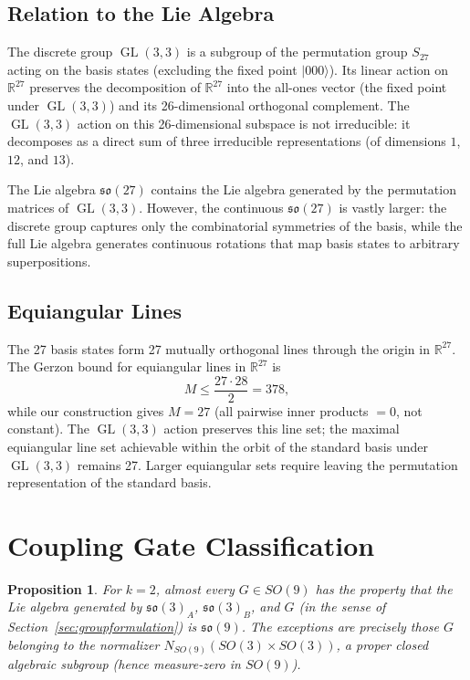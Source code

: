 \documentclass[12pt,a4paper]{article}
\newtheorem{proposition}[theorem]{Proposition}
\newcommand{\GL}{\operatorname{GL}}
\begin{document}
\subsection{Relation to the Lie Algebra}

The discrete group $\GL(3,3)$ is a subgroup of the permutation group
$S_{27}$ acting on the basis states (excluding the fixed point
$|000\rangle$). Its linear action on $\mathbb{R}^{27}$ preserves the
decomposition of $\mathbb{R}^{27}$ into the all-ones vector (the fixed
point under $\GL(3,3)$) and its 26-dimensional orthogonal complement.
The $\GL(3,3)$ action on this 26-dimensional subspace is not
irreducible: it decomposes as a direct sum of three irreducible
representations (of dimensions $1$, $12$, and $13$).

The Lie algebra $\mathfrak{so}(27)$ contains the Lie algebra generated
by the permutation matrices of $\GL(3,3)$. However, the continuous
$\mathfrak{so}(27)$ is vastly larger: the discrete group captures only
the combinatorial symmetries of the basis, while the full Lie algebra
generates continuous rotations that map basis states to arbitrary
superpositions.

\subsection{Equiangular Lines}

The 27 basis states form 27 mutually orthogonal lines through the origin
in $\mathbb{R}^{27}$. The Gerzon bound for equiangular lines in
$\mathbb{R}^{27}$ is
\[
M \le \frac{27 \cdot 28}{2} = 378,
\]
while our construction gives $M = 27$ (all pairwise inner products $= 0$,
not constant). The $\GL(3,3)$ action preserves this line set; the
maximal equiangular line set achievable within the orbit of the standard
basis under $\GL(3,3)$ remains 27. Larger equiangular sets require
leaving the permutation representation of the standard basis.

\section{Coupling Gate Classification}

\begin{proposition}
\label{prop:generic}
For $k=2$, almost every $G \in SO(9)$ has the property that the Lie
algebra generated by $\mathfrak{so}(3)_A$, $\mathfrak{so}(3)_B$, and
$G$ (in the sense of Section~\ref{sec:groupformulation}) is
$\mathfrak{so}(9)$. The exceptions are precisely those $G$ belonging to
the normalizer $N_{SO(9)}(SO(3)\times SO(3))$, a proper closed
algebraic subgroup (hence measure-zero in $SO(9)$).
\end{proposition}
\end{document}
